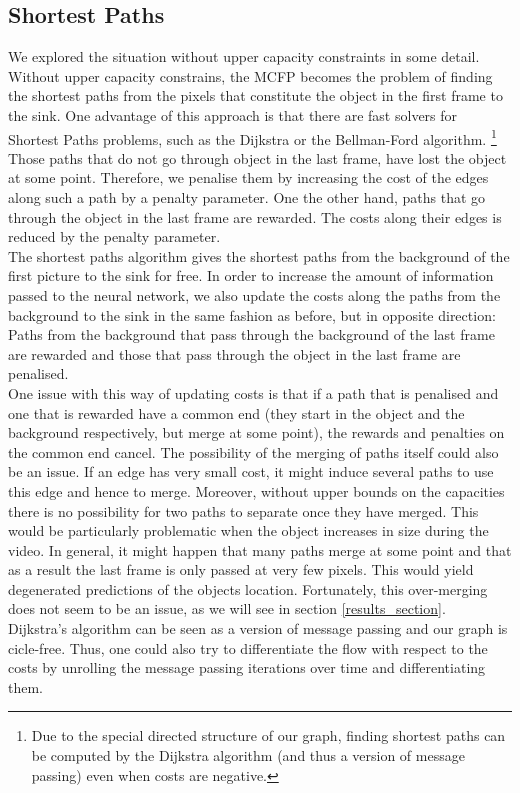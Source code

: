 \documentclass{article}
\begin{document}
{\subsection{Shortest Paths}\label{shortestPaths}
We explored the situation without upper capacity constraints in some detail. Without upper capacity constrains, the MCFP becomes the problem of finding the shortest paths from the pixels that constitute the object in the first frame to the sink. One advantage of this approach is that there are fast solvers for Shortest Paths problems, such as the Dijkstra  or the Bellman-Ford algorithm.
\footnote{Due to the special directed structure of our graph, finding shortest paths can be computed by the Dijkstra algorithm (and thus a version of message passing) even when costs are negative.}
Those paths that do not go through object in the last frame, have lost the object at some point. Therefore, we penalise them by increasing the cost of the edges along such a path by a penalty parameter. One the other hand, paths that go through the object in the last frame are rewarded. The costs along their edges is reduced by the penalty parameter.\\
The shortest paths algorithm gives the shortest paths from the background of the first picture to the sink for free. In order to increase the amount of information passed to the neural network, we also update the costs along the paths from the background to the sink in the same fashion as before, but in opposite direction: Paths from the background that pass through the background of the last frame are rewarded and those that pass through the object in the last frame are penalised.\\
One issue with this way of updating costs is that if a path that is penalised and one that is rewarded have a common end (they start in the object and the background respectively, but merge at some point), the rewards and penalties on the common end cancel. The possibility of the merging of paths itself could also be an issue. If an edge has very small cost, it might induce several paths to use this edge and hence to merge. Moreover, without upper bounds on the capacities there is no possibility for two paths to separate once they have merged. This would be particularly problematic when the object increases in size during the video. In general, it might happen that many paths merge at some point and that as a result the last frame is only passed at very few pixels. This would yield degenerated predictions of the objects location. Fortunately, this over-merging does not seem to be an issue, as we will see in section \ref{results_section}.\\
Dijkstra's algorithm can be seen as a version of message passing and our graph is cicle-free. Thus, one could also try to differentiate the flow with respect to the costs by unrolling the message passing iterations over time and differentiating them.

}
\end{document}

